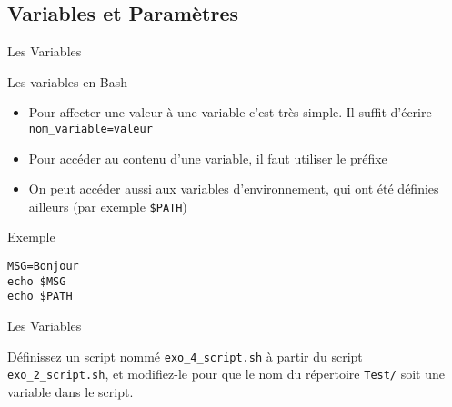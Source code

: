 \subsection{Variables et Paramètres}
\begin{frame}[fragile]{Les Variables}
  \begin{block}{Les variables en Bash}
    \begin{itemize}
    \item Pour affecter une valeur à une variable c'est très simple. Il suffit d'écrire \texttt{nom\_variable=valeur}
    \item Pour accéder au contenu d'une variable, il faut utiliser le préfixe \lin{\$}
    \item On peut accéder aussi aux variables d'environnement, qui ont été définies ailleurs (par exemple \texttt{\$PATH}) 
    \end{itemize}
  \end{block}

  \begin{block}{Exemple}
\begin{verbatim}
MSG=Bonjour
echo $MSG
echo $PATH
\end{verbatim}
  \end{block}

  \begin{exercicelet}{Les Variables}
    \begin{questions}
    \item Définissez un script nommé \texttt{exo\_4\_script.sh} à partir du script \texttt{exo\_2\_script.sh}, et modifiez-le pour que le nom du répertoire \texttt{Test/} soit une variable dans le script.
    \end{questions}
  \end{exercicelet}
  
\end{frame}

